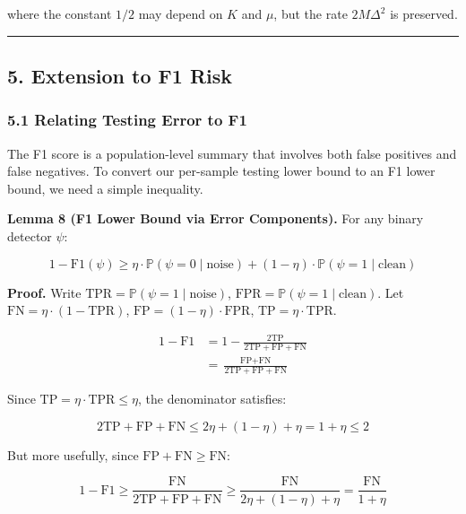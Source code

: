 \documentclass[
  12pt,
]{article}
\begin{document}
where the constant \(1/2\) may depend on \(K\) and \(\mu\), but the rate
\(2M\Delta^2\) is preserved.

\begin{center}\rule{0.5\linewidth}{0.5pt}\end{center}

\subsection{5. Extension to F1 Risk}\label{extension-to-f1-risk}

\subsubsection{5.1 Relating Testing Error to
F1}\label{relating-testing-error-to-f1}

The F1 score is a population-level summary that involves both false
positives and false negatives. To convert our per-sample testing lower
bound to an F1 lower bound, we need a simple inequality.

\textbf{Lemma 8 (F1 Lower Bound via Error Components).} For any binary
detector \(\psi\):

\[1 - \text{F1}(\psi) \geq \eta \cdot \mathbb{P}(\psi=0 \mid \text{noise}) + (1-\eta) \cdot \mathbb{P}(\psi=1 \mid \text{clean})\]

\textbf{Proof.} Write
\(\text{TPR} = \mathbb{P}(\psi=1 \mid \text{noise})\),
\(\text{FPR} = \mathbb{P}(\psi=1 \mid \text{clean})\). Let
\(\text{FN} = \eta \cdot (1 - \text{TPR})\),
\(\text{FP} = (1-\eta) \cdot \text{FPR}\),
\(\text{TP} = \eta \cdot \text{TPR}\).

\[\begin{aligned}
1 - \text{F1} &= 1 - \frac{2\text{TP}}{2\text{TP} + \text{FP} + \text{FN}} \\
&= \frac{\text{FP} + \text{FN}}{2\text{TP} + \text{FP} + \text{FN}}
\end{aligned}\]

Since \(\text{TP} = \eta\cdot\text{TPR} \leq \eta\), the denominator
satisfies:

\[2\text{TP} + \text{FP} + \text{FN} \leq 2\eta + (1-\eta) + \eta = 1 + \eta \leq 2\]

But more usefully, since \(\text{FP} + \text{FN} \geq \text{FN}\):

\[1 - \text{F1} \geq \frac{\text{FN}}{2\text{TP} + \text{FP} + \text{FN}} \geq \frac{\text{FN}}{2\eta + (1-\eta) + \eta} = \frac{\text{FN}}{1+\eta}\]
\end{document}
